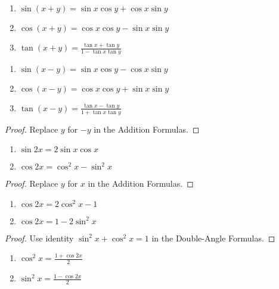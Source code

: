 \documentclass[a4paper,8pt]{article}
\begin{document}
\begin{outline}
    \begin{enumerate}
      \item \(\sin{(x+y)} = \sin{x}\cos{y} + \cos{x}\sin{y}\)
      \item \(\cos{(x+y)} = \cos{x}\cos{y} - \sin{x}\sin{y}\)
      \item \(\tan{(x+y)} = \frac{\tan{x}+\tan{y}}{1-\tan{x}\tan{y}}\)
    \end{enumerate}

    \begin{enumerate}
      \item \(\sin{(x-y)} = \sin{x}\cos{y} - \cos{x}\sin{y}\)
      \item \(\cos{(x-y)} = \cos{x}\cos{y} + \sin{x}\sin{y}\)
      \item \(\tan{(x-y)} = \frac{\tan{x}-\tan{y}}{1+\tan{x}\tan{y}}\)
    \end{enumerate}

    \begin{proof}
      Replace \(y\) for \(-y\) in the Addition Formulas.
    \end{proof}

  \pagebreak
    \begin{enumerate}
      \item \(\sin{2x} = 2\sin{x}\cos{x}\)
      \item \(\cos{2x} = \cos^2 x - \sin^2 x\)
    \end{enumerate}

    \begin{proof}
      Replace \(y\) for \(x\) in the Addition Formulas.
    \end{proof}

    \begin{enumerate}
      \item \(\cos{2x} = 2\cos^2 x - 1\)
      \item \(\cos{2x} = 1 - 2\sin^2 x\)
    \end{enumerate}

    \begin{proof}
      Use identity \(\sin^2 x + \cos^2 x = 1\) in the Double-Angle Formulas.
    \end{proof}

    \begin{enumerate}
      \item \(\cos^2 x = \frac{1 + \cos{2x}}{2}\)
      \item \(\sin^2 x = \frac{1 - \cos{2x}}{2}\)
    \end{enumerate}


\end{outline}
\end{document}
